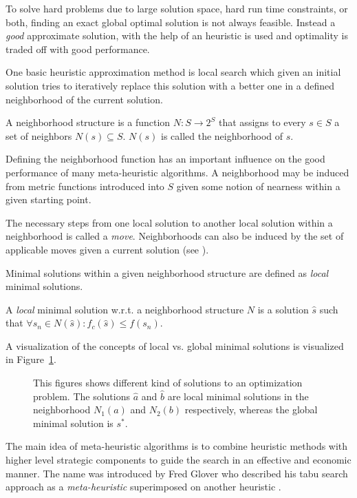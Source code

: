 To solve hard problems due to large solution space, hard run time constraints, or both, finding an exact global optimal solution is not always feasible. 
Instead a \emph{good} approximate solution, with the help of an heuristic is used and optimality is traded off with good performance.

One basic heuristic approximation method is local search which given an initial solution tries to iteratively replace this solution with a better one in a defined neighborhood of the current solution. 
\begin{definition}\label{def:neighborhood}
A neighborhood structure is a function $N:S\rightarrow 2^S$ that assigns to every $s \in S$ a set of neighbors $N(s) \subseteq S$. $N(s)$ is called the neighborhood of $s$.
\end{definition}
Defining the neighborhood function has an important influence on the good performance of many meta-heuristic algorithms. 
A neighborhood may be induced from metric functions introduced into $S$ given some notion of nearness within a given starting point. 

The necessary steps from one local solution to another local solution within a neighborhood is called a \emph{move}. Neighborhoods can also be induced by the set of applicable moves given a current solution (see \cite{gendreau2003tabusearch}).

Minimal solutions within a given neighborhood structure are defined as \emph{local} minimal solutions.
\begin{definition}
 A \emph{local} minimal solution w.r.t. a neighborhood structure $N$ is a solution $\hat{s}$  such that $\forall s_n \in N(\hat{s}):f_c(\hat{s})\leq f(s_n)$. 
\end{definition}
A visualization of the concepts of local vs. global minimal solutions is visualized in Figure~\ref{fig:fig_local_global}.
\begin{figure}[thpb]
   \footnotesize
   \centering
   \def\svgwidth{0.75\textwidth}
        
   \caption[]{This figures shows different kind of solutions to an optimization problem. The solutions $\hat{a}$ and $\hat{b}$ are local minimal solutions in the neighborhood $N_1(a)$ and $N_2(b)$ respectively, whereas the global minimal solution is $s^*$.}
   \label{fig:fig_local_global}
\end{figure}

The main idea of meta-heuristic algorithms is to combine heuristic methods with higher level strategic components to guide the search in an effective and economic manner. 
The name was introduced by Fred Glover who described his tabu search approach \grqq as a \emph{meta-heuristic} superimposed on another heuristic \grqq \cite{glover1988tabu}. 

